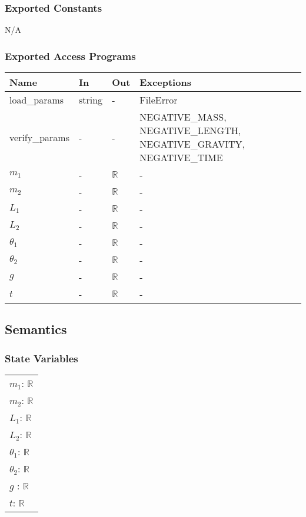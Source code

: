 \documentclass[12pt, titlepage]{article}
\begin{document}
\subsubsection{Exported Constants}

N/A

\subsubsection{Exported Access Programs}

\begin{center}
\begin{tabular}{p{4cm} p{2cm} p{2cm} p{6cm}}
\hline
\textbf{Name} & \textbf{In} & \textbf{Out} & \textbf{Exceptions} \\
\hline
load\_params & string & - & FileError \\
\hline
verify\_params & - & - & NEGATIVE\_MASS, NEGATIVE\_LENGTH, NEGATIVE\_GRAVITY, NEGATIVE\_TIME\\
\hline
$m_1$ & - & $\mathbb{R}$ & - \\
\hline
$m_2$ & - & $\mathbb{R}$ & -\\
\hline
$L_1$ & - & $\mathbb{R}$ & - \\
\hline
$L_2$ & - & $\mathbb{R}$ & -\\
\hline
$\theta_1$ & - & $\mathbb{R}$ & -\\
\hline
$\theta_2$ & - & $\mathbb{R}$ & - \\
\hline
$g$ & - & $\mathbb{R}$ & - \\
\hline
$t$ & - & $\mathbb{R}$ & - \\
\hline
\end{tabular}
\end{center}

\subsection{Semantics}

\subsubsection{State Variables}
\renewcommand{\arraystretch}{1.2}
\begin{longtable*}[l]{l} 

$m_1$: $\mathbb{R}$ \\
$m_2$: $\mathbb{R}$ \\
$L_1$: $\mathbb{R}$ \\
$L_2$: $\mathbb{R}$ \\
$\theta_1$: $\mathbb{R}$ \\
$\theta_2$: $\mathbb{R}$ \\
$g$ : $\mathbb{R}$ \\
$t$: $\mathbb{R}$ \\

\end{longtable*}
\end{document}
